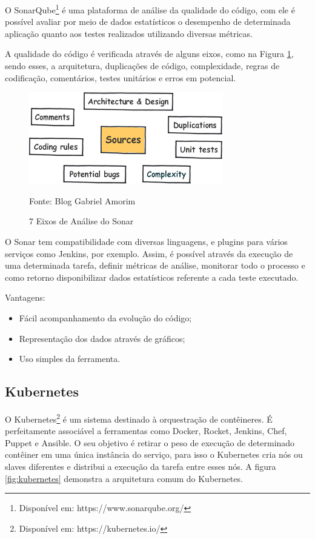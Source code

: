 O SonarQube\footnote{Disponível em: https://www.sonarqube.org/} é uma plataforma de análise da qualidade do código, com ele é possível avaliar por meio de dados estatísticos o desempenho de determinada aplicação quanto aos testes realizados utilizando diversas métricas. 

A qualidade do código é verificada através de alguns eixos, como na Figura \ref{fig:7axessonar}, sendo esses, a arquitetura, duplicações de código, complexidade, regras de codificação, comentários, testes unitários e erros em potencial.

\begin{figure}[htb]
	\centering
	\includegraphics[width=0.5\linewidth]{imagens/7axes_sonar}
	\caption{7 Eixos de Análise do Sonar}
	Fonte: Blog Gabriel Amorim\footnotemark
	\label{fig:7axessonar}
\end{figure}

O Sonar tem compatibilidade com diversas linguagens, e plugins para vários serviços como Jenkins, por exemplo. Assim, é possível através da execução de uma determinada tarefa, definir métricas de análise, monitorar todo o processo e como retorno disponibilizar dados estatísticos referente a cada teste executado.\cite{cabralrelato}

Vantagens:
\begin{itemize}
	\item Fácil acompanhamento da evolução do código;
	\item Representação dos dados através de gráficos;
	\item Uso simples da ferramenta.
\end{itemize}

\subsection{Kubernetes}

O Kubernetes\footnote{Disponível em: https://kubernetes.io/} é um sistema destinado à orquestração de contêineres. É perfeitamente associável a ferramentas como Docker, Rocket, Jenkins, Chef, Puppet e Ansible. O seu objetivo é retirar o peso de execução de determinado contêiner em uma única instância do serviço, para isso o Kubernetes cria nós ou slaves diferentes e distribui a execução da tarefa entre esses nós. A figura \ref{fig:kubernetes} demonstra a arquitetura comum do Kubernetes.

